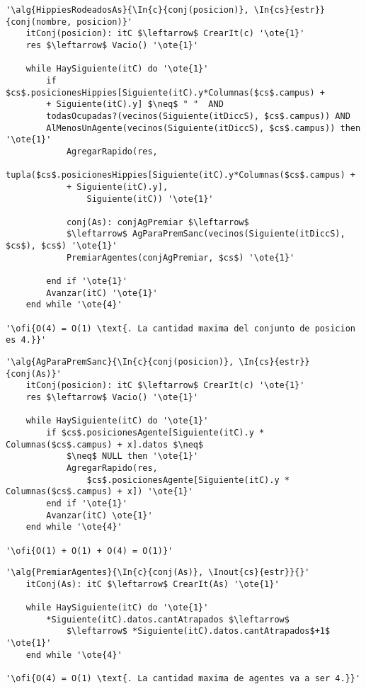 \begin{lstlisting}[mathescape]
'\alg{HippiesRodeadosAs}{\In{c}{conj(posicion)}, \In{cs}{estr}}{conj(nombre, posicion)}'
	itConj(posicion): itC $\leftarrow$ CrearIt(c) '\ote{1}'
	res $\leftarrow$ Vacio() '\ote{1}'

	while HaySiguiente(itC) do '\ote{1}'
		if $cs$.posicionesHippies[Siguiente(itC).y*Columnas($cs$.campus) + 
		+ Siguiente(itC).y] $\neq$ " "  AND 
		todasOcupadas?(vecinos(Siguiente(itDiccS), $cs$.campus)) AND 
		AlMenosUnAgente(vecinos(Siguiente(itDiccS), $cs$.campus)) then '\ote{1}'
			AgregarRapido(res, 
			tupla($cs$.posicionesHippies[Siguiente(itC).y*Columnas($cs$.campus) +
			+ Siguiente(itC).y], 
				Siguiente(itC)) '\ote{1}'

			conj(As): conjAgPremiar $\leftarrow$
			$\leftarrow$ AgParaPremSanc(vecinos(Siguiente(itDiccS), $cs$), $cs$) '\ote{1}'
			PremiarAgentes(conjAgPremiar, $cs$) '\ote{1}'

		end if '\ote{1}'
		Avanzar(itC) '\ote{1}'
	end while '\ote{4}'

'\ofi{O(4) = O(1) \text{. La cantidad maxima del conjunto de posicion es 4.}}'
\end{lstlisting}

\begin{lstlisting}[mathescape]
'\alg{AgParaPremSanc}{\In{c}{conj(posicion)}, \In{cs}{estr}}{conj(As)}'
	itConj(posicion): itC $\leftarrow$ CrearIt(c) '\ote{1}'
	res $\leftarrow$ Vacio() '\ote{1}'

	while HaySiguiente(itC) do '\ote{1}'
		if $cs$.posicionesAgente[Siguiente(itC).y * Columnas($cs$.campus) + x].datos $\neq$ 
			$\neq$ NULL then '\ote{1}'
			AgregarRapido(res, 
				$cs$.posicionesAgente[Siguiente(itC).y * Columnas($cs$.campus) + x]) '\ote{1}'
		end if '\ote{1}'
		Avanzar(itC) \ote{1}'
	end while '\ote{4}'

'\ofi{O(1) + O(1) + O(4) = O(1)}'
\end{lstlisting}

\begin{lstlisting}[mathescape]
'\alg{PremiarAgentes}{\In{c}{conj(As)}, \Inout{cs}{estr}}{}'
	itConj(As): itC $\leftarrow$ CrearIt(As) '\ote{1}'
	
	while HaySiguiente(itC) do '\ote{1}'
		*Siguiente(itC).datos.cantAtrapados $\leftarrow$
			$\leftarrow$ *Siguiente(itC).datos.cantAtrapados$+1$ '\ote{1}'
	end while '\ote{4}'

'\ofi{O(4) = O(1) \text{. La cantidad maxima de agentes va a ser 4.}}'
\end{lstlisting}

